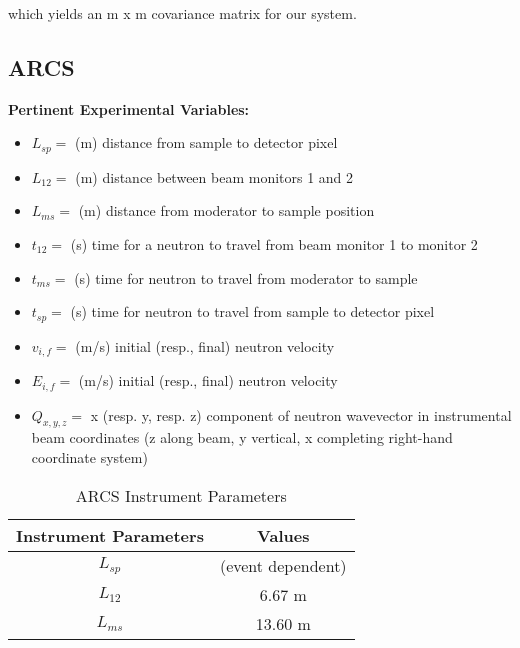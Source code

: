 \documentclass[aps,prl,twocolumn,groupedaddress]{revtex4-1}
\begin{document}
which yields an m x m covariance matrix for our system.

\subsection{ARCS}

\textbf{Pertinent Experimental Variables:}
\begin{itemize}
\item $L_{sp} = $ (m) distance from sample to detector pixel

\item $L_{12} = $ (m) distance between beam monitors 1 and 2

\item $L_{ms} = $ (m) distance from moderator to sample position

\item $t_{12} = $ (s) time for a neutron to travel from beam monitor 1 to monitor 2

\item $t_{ms} = $ (s) time for neutron to travel from moderator to sample

\item $t_{sp} = $ (s) time for neutron to travel from sample to detector pixel

\item $v_{i,f} = $ (m/s) initial (resp., final) neutron velocity

\item $E_{i,f} = $ (m/s) initial (resp., final) neutron velocity

\item $Q_{x,y,z} = $ x (resp. y, resp. z) component of neutron wavevector in instrumental beam coordinates (z along beam, y vertical, x completing right-hand coordinate system)
\end{itemize}

\begin{table}[H]
\centering
\caption{ARCS Instrument Parameters}
\begin{tabular}{|c|c|}
\hline
Instrument Parameters & Values \\ \hline
$L_{sp}$ & (event dependent) \\ \hline
$L_{12}$ & 6.67 m \\ \hline
$L_{ms}$ & 13.60 m \\ \hline

\end{tabular}
\end{table}
\end{document}
